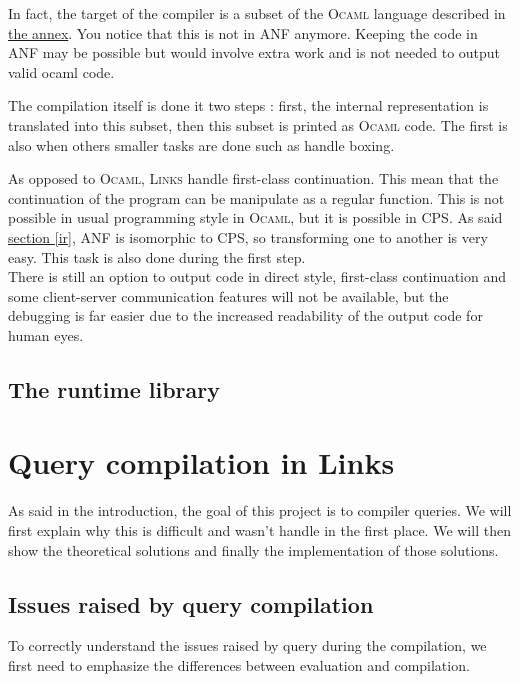 \documentclass[11pt]{article}
\newcommand\mysc[1]{{\rmfamily\textsc{#1}}\xspace}
\newcommand\links{\mysc{Links}}
\newcommand\ocaml{\mysc{Ocaml}}
\newcommand\refsec[1]{\hyperref[#1]{section \ref*{#1}}}
\begin{document}
In fact, the target of the compiler is a subset of the \ocaml language described in \hyperref[ocamlsubset]{the annex}. You notice that this is not in ANF anymore. Keeping the code in ANF may be possible but would involve extra work and is not needed to output valid ocaml code.

The compilation itself is done it two steps : first, the internal representation is translated into this subset, then this subset is printed as \ocaml code. The first is also when others smaller tasks are done such as handle boxing.

As opposed to \ocaml, \links handle first-class continuation. This mean that the continuation of the program can be manipulate as a regular function. This is not possible in usual programming style in \ocaml, but it is possible in CPS. 
As said \refsec{ir}, ANF is isomorphic to CPS, so transforming one to another is very easy. This task is also done during the first step.\\
There is still an option to output code in direct style, first-class continuation and some client-server communication features will not be available, but the debugging is far easier due to the increased readability of the output code for human eyes.

\subsection{The runtime library\label{runtime}}



\section{Query compilation in Links}

As said in the introduction, the goal of this project is to compiler queries. We will first explain why this is difficult and wasn't handle in the first place. We will then show the theoretical solutions and finally the implementation of those solutions.

\subsection{Issues raised by query compilation}

To correctly understand the issues raised by query during the compilation, we first need to emphasize the differences between evaluation and compilation. \\
\end{document}
